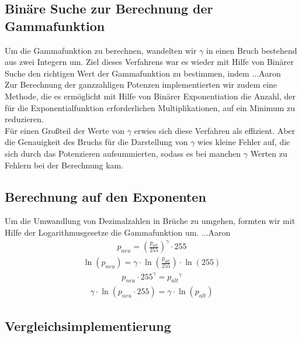\documentclass[course=erap]{aspdoc}
\begin{document}
\subsection{Binäre Suche zur Berechnung der Gammafunktion}
Um die Gammafunktion zu berechnen, wandelten wir  $\gamma$ in einen Bruch bestehend aus zwei Integern um. Ziel dieses Verfahrens war es wieder mit Hilfe von Binärer Suche den richtigen Wert der Gammafunktion zu bestimmen, indem ...Aaron
\\
\newline
\noindent	
Zur Berechnung der ganzzahligen Potenzen implementierten wir zudem eine Methode, die es ermöglicht mit Hilfe von Binärer Exponentiation die Anzahl, der für die Exponentialfunktion erforderlichen Multiplikationen, auf ein Minimum zu reduzieren. 
\\
\newline
\noindent		 
Für einen Großteil der Werte von $\gamma$ erwies sich diese Verfahren als effizient. Aber die Genauigkeit des Bruchs für die Darstellung von $\gamma$ wies kleine Fehler auf, die sich durch das Potenzieren aufsummierten, sodass es bei manchen $\gamma$ Werten zu Fehlern bei der Berechnung kam.       

\subsection{Berechnung auf den Exponenten}
Um die Umwandlung von Dezimalzahlen in Brüche zu umgehen, formten wir mit Hilfe der Logarithmusgesetze die Gammafunktion um. ...Aaron
\begin{align}	
p_{neu} = \left(\frac{p_{alt}}{255}\right)^{\gamma} \cdot 255
\end{align}
\begin{align}	
\ln (p_{neu}) = \gamma \cdot \ln\left(\frac{p_{alt}}{255}\right) \cdot \ln(255)
\end{align}
\begin{align}
p_{neu} \cdot 255^\gamma = {p_{alt}}^{\gamma}
\end{align}
\begin{align}
\gamma \cdot \ln ( p_{neu} \cdot 255) = \gamma \cdot \ln({p_{alt}})
\end{align}

\subsection{Vergleichsimplementierung}
\end{document}
